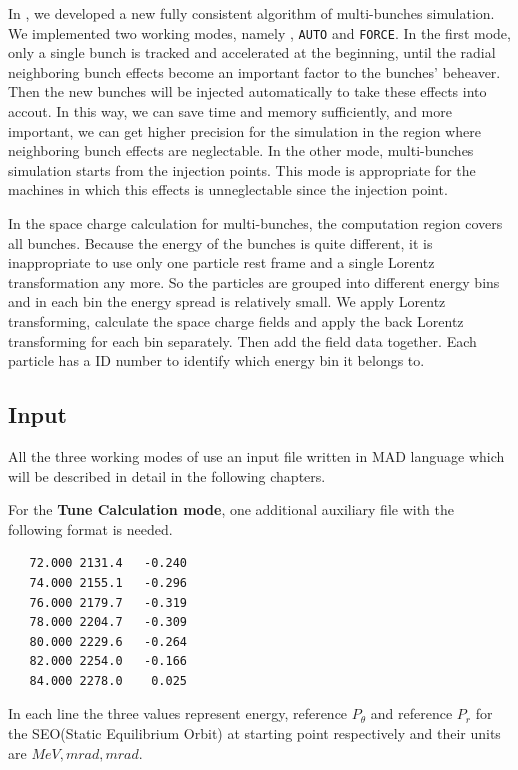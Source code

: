 In \opalcycl, we developed a new fully consistent algorithm of multi-bunches simulation.  We implemented two working modes, namely , 
\texttt{AUTO} and \texttt{FORCE}. In the first mode, only a single bunch is tracked and accelerated at the beginning,
until the radial neighboring bunch effects become an important factor to the bunches' beheaver. Then the new bunches will be injected automatically to 
take these effects into accout. In this way, we can save time and memory sufficiently, and more important, 
we can get higher precision for the simulation in the region where neighboring bunch effects are neglectable.
In the other mode, multi-bunches simulation starts from the injection points. This mode is appropriate for the machines in which this effects is 
unneglectable since the injection point.    

In the space charge calculation for multi-bunches, the computation region covers all bunches.
Because the energy of the bunches is quite different, it is inappropriate to use only one particle rest frame and a single Lorentz transformation any more.
So the particles are grouped into different energy bins and in each bin the energy spread is relatively small. We apply Lorentz transforming, calculate
the space charge fields and apply the back Lorentz transforming for each bin separately. Then add the field data together. Each particle has a ID number to identify 
which energy bin it belongs to.

\subsection{Input}  
All the three working modes of \opalcycl use an input file written in MAD language which will be described in detail in the following chapters.

For the  {\bfseries Tune Calculation mode}, one additional auxiliary file with the following format is needed.
\begin{verbatim}
   72.000 2131.4   -0.240  
   74.000 2155.1   -0.296  
   76.000 2179.7   -0.319 
   78.000 2204.7   -0.309 
   80.000 2229.6   -0.264 
   82.000 2254.0   -0.166 
   84.000 2278.0    0.025 
\end{verbatim}
In each line the three values represent energy, reference $P_\theta$ and reference $P_r$ for the SEO(Static Equilibrium Orbit) 
at starting point respectively and their units are $MeV,  mrad,  mrad$.

